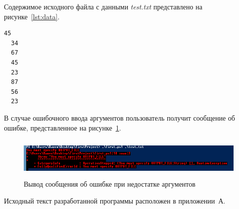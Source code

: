 \newpage

Содержимое исходного файла с данными \textit{test.txt} представлено на рисунке~\ref{lst:data}.
\begin{lstlisting}[caption=Содержимое исходного файла \textit{test.txt},label=lst:data]
  45
  34
  67
  45
  23
  87
  56
  23
\end{lstlisting}

В случае ошибочного ввода аргументов пользователь получит сообщение об ошибке,
представленное на рисунке~\ref{fig:error}.

\begin{figure}[htbp]
  \centering
  \includegraphics[width=150mm,height=20mm]{img/error}
  \caption{Вывод сообщения об ошибке при недостатке аргументов}\label{fig:error}
\end{figure}

Исходный текст разработанной программы расположен в приложении~А.

\newpage
